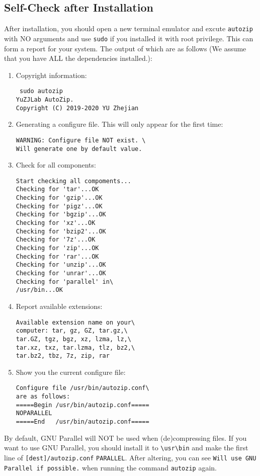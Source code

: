 \documentclass[fleqn,10pt]{SelfArx} %
\begin{document}
\subsection{Self-Check after Installation}
After installation, you should open a new terminal emulator and excute \verb|autozip| with NO arguments and use \verb|sudo| if you installed it with root privilege. This can form a report for your system. The output of which are as follows (We assume that you have ALL the dependencies installed.):
\begin{enumerate}
\item Copyright information:
\begin{verbatim}
 sudo autozip
YuZJLab AutoZip.
Copyright (C) 2019-2020 YU Zhejian
\end{verbatim}
\item Generating a configure file. This will only appear for the first time:
\begin{verbatim}
WARNING: Configure file NOT exist. \
Will generate one by default value.
\end{verbatim}
\item Check for all components:
\begin{verbatim}
Start checking all compoments...
Checking for 'tar'...OK
Checking for 'gzip'...OK
Checking for 'pigz'...OK
Checking for 'bgzip'...OK
Checking for 'xz'...OK
Checking for 'bzip2'...OK
Checking for '7z'...OK
Checking for 'zip'...OK
Checking for 'rar'...OK
Checking for 'unzip'...OK
Checking for 'unrar'...OK
Checking for 'parallel' in\
/usr/bin...OK
\end{verbatim}
\item Report available extensions:
\begin{verbatim}
Available extension name on your\
computer: tar, gz, GZ, tar.gz,\
tar.GZ, tgz, bgz, xz, lzma, lz,\
tar.xz, txz, tar.lzma, tlz, bz2,\
tar.bz2, tbz, 7z, zip, rar
\end{verbatim}
\item Show you the current configure file:
\begin{verbatim}
Configure file /usr/bin/autozip.conf\
are as follows:
=====Begin /usr/bin/autozip.conf=====
NOPARALLEL
=====End   /usr/bin/autozip.conf=====
\end{verbatim}
\end{enumerate}
By default, GNU Parallel will NOT be used when (de)compressing files. If you want to use GNU Parallel, you should install it to \verb|\usr\bin| and make the first line of \verb|[dest]/autozip.conf| \verb|PARALLEL|. After altering, you can see \verb|Will use GNU Parallel if possible.| when running the command \verb|autozip| again.
\end{document}
